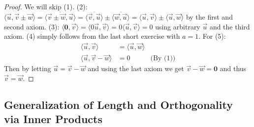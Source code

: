 \begin{proof}
We will skip (1). (2): $\langle \vec{u}, \vec{v} \pm \vec{w} \rangle = \overline{\langle \vec{v} \pm \vec{w}, \vec{u} \rangle} = \overline{\langle \vec{v}, \vec{u} \rangle} \pm \overline{\langle \vec{w}, \vec{u} \rangle} = \langle \vec{u}, \vec{v} \rangle \pm \langle \vec{u}, \vec{w} \rangle$ by the first and second axiom. (3): $\langle \textbf{0}, \vec{v} \rangle = \langle 0\vec{u}, \vec{v} \rangle = 0\langle \vec{u}, \vec{v} \rangle = 0$ using arbitrary $\vec{u}$ and the third axiom. (4) simply follows from the last short exercise with $a = 1$. For (5):
\begin{align*}
\langle \vec{u}, \vec{v} \rangle &= \langle \vec{u}, \vec{w} \rangle \\
\langle \vec{u}, \vec{v} - \vec{w} \rangle &= 0 & \text{(By (1))}
\end{align*}
Then by letting $\vec{u} = \vec{v} - \vec{w}$ and using the last axiom we get $\vec{v} - \vec{w} = \textbf{0}$ and thus $\vec{v} = \vec{w}$.
\end{proof}

\subsection{Generalization of Length and Orthogonality via Inner Products}

